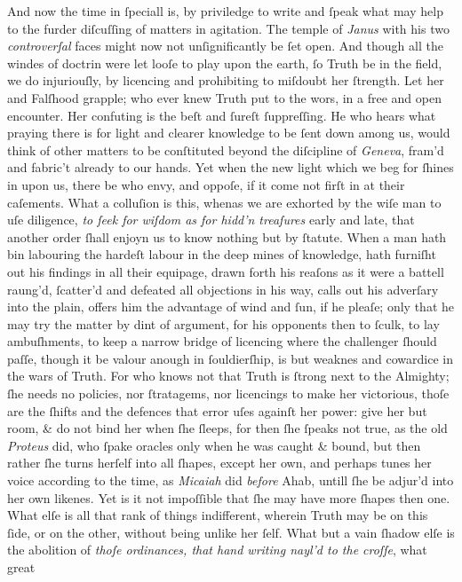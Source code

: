 And now the time in ſpeciall is, by priviledge to write and ſpeak what may help
to the furder diſcuſſing of matters in agitation.  The temple of \textit{Janus}
with his two \textit{controverſal} faces might now not unſignificantly be ſet
open.  And though all the windes of doctrin were let looſe to play upon the
earth, ſo Truth be in the field, we do injuriouſly, by licencing and prohibiting
to miſdoubt her ſtrength.  Let her and Falſhood grapple; who ever knew Truth put
to the wors, in a free and open encounter.  Her confuting is the beſt and ſureſt
ſuppreſſing.  He who hears what praying there is for light and clearer knowledge
to be ſent down among us, would think of other matters to be conſtituted beyond
the diſcipline of \textit{Geneva}, fram'd and fabric't already to our hands.
Yet when the new light which we beg for ſhines in upon us, there be who envy,
and oppoſe, if it come not firſt in at their caſements.  What a colluſion is
this, whenas we are exhorted by the wiſe man to uſe diligence, \textit{to ſeek
for wiſdom as for hidd'n treaſures} early and late, that another order ſhall
enjoyn us to know nothing but by ſtatute.  When a man hath bin labouring the
hardeſt labour in the deep mines of knowledge, hath furniſht out his findings in
all their equipage, drawn forth his reaſons as it were a battell raung'd,
ſcatter'd and defeated all objections in his way, calls out his adverſary into
the plain, offers him the advantage of wind and ſun, if he pleaſe; only that he
may try the matter by dint of argument, for his opponents then to ſculk, to lay
ambuſhments, to keep a narrow bridge of licencing where the challenger ſhould
paſſe, though it be valour anough in ſouldierſhip, is but weaknes and cowardice
in the wars of Truth.  For who knows not that Truth is ſtrong next to the
Almighty; ſhe needs no policies, nor ſtratagems, nor licencings to make her
victorious, thoſe are the ſhifts and the defences that error uſes againſt her
power: give her but room, \& do not bind her when ſhe ſleeps, for then ſhe
ſpeaks not true, as the old \textit{Proteus} did, who ſpake oracles only when he
was caught \& bound, but then rather ſhe turns herſelf into all ſhapes, except
her own, and perhaps tunes her voice according to the time, as \textit{Micaiah}
did \textit{before} Ahab, untill ſhe be adjur'd into her own likenes.  Yet is it
not impoſſible that ſhe may have more ſhapes then one.  What elſe is all that
rank of things indifferent, wherein Truth may be on this ſide, or on the other,
without being unlike her ſelf.  What but a vain ſhadow elſe is the abolition of
\textit{thoſe ordinances, that hand writing nayl'd to the croſſe}, what great
